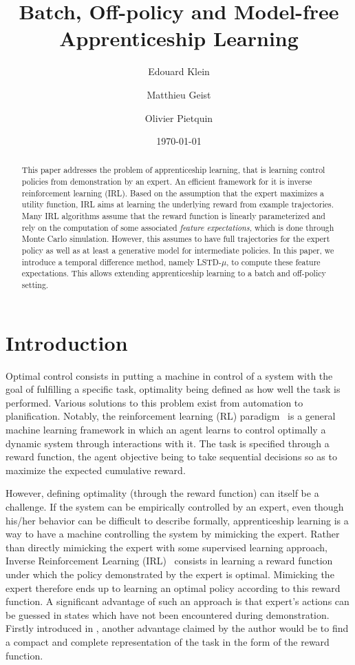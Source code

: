 \documentclass{llncs}
\title{Batch, Off-policy and Model-free Apprenticeship Learning}
\author{Edouard Klein\inst{1}\inst{3} \and Matthieu Geist\inst{1} \and Olivier Pietquin\inst{1}\inst{2}}
\institute{
 1. Supélec-Metz Campus, IMS Research group, France, \texttt{prenom.nom@supelec.fr}\\
 2. UMI 2958 CNRS - GeorgiaTech, France\\
 3. Equipe ABC, LORIA-CNRS, France.
 }
\date{\today}
\begin{document}
\maketitle
\begin{abstract}
  This paper addresses the problem of apprenticeship learning, that
  is learning control policies from demonstration by an expert. An
  efficient framework for it is inverse reinforcement learning
  (IRL). Based on the assumption that the expert maximizes a utility
  function, IRL aims at learning the underlying reward from example 
  trajectories. Many IRL algorithms
  assume that the reward function is linearly parameterized and rely
  on the computation of some associated \emph{feature expectations},
  which is done through Monte Carlo simulation. However, this
  assumes to have full trajectories for the expert policy as well as
  at least a generative model for intermediate policies. In this
  paper, we introduce a temporal difference method, namely LSTD-$\mu$, to compute these
  feature expectations. This allows extending apprenticeship
  learning to a batch and off-policy setting.
\end{abstract}
\section{Introduction}

Optimal control consists in putting a machine in control of a system
with the goal of fulfilling a specific task, optimality being
defined as how well the task is performed. Various solutions to this
problem exist from automation to planification. Notably, the
reinforcement learning (RL) paradigm~\citep{sutton1998reinforcement} is a general
machine learning framework in which an agent learns to control
optimally a dynamic system through interactions with it. The task is
specified through a reward function, the agent objective being to
take sequential decisions so as to maximize the expected cumulative
reward.

However, defining optimality (through the reward function) can
itself be a challenge. If the system can be empirically controlled
by an expert, even though his/her behavior can be difficult to
describe formally, apprenticeship learning is a way to have a
machine controlling the system by mimicking the expert. Rather than
directly mimicking the expert with some supervised learning
approach, Inverse Reinforcement Learning (IRL)~\citep{ng2000algorithms}
consists in learning a reward function under which the policy
demonstrated by the expert is optimal. Mimicking the expert therefore
ends up to learning an optimal policy according to this reward
function. A significant advantage of such an approach is that
expert's actions can be guessed in states which have not been
encountered during demonstration. Firstly introduced in \citep{russell1998learning}, another advantage claimed by the author would be to
find a compact and complete representation of the task in the form
of the reward function.
\end{document}
